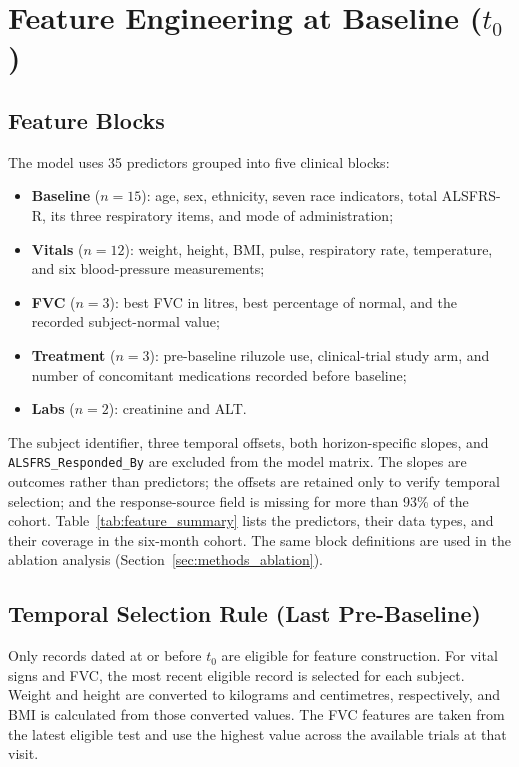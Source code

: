 \section{Feature Engineering at Baseline ($t_0$)}
\label{sec:methods_features}
\subsection{Feature Blocks}
\label{sec:methods_feature_blocks}
The model uses 35 predictors grouped into five clinical blocks:
\begin{itemize}
  \item \textbf{Baseline} ($n\!=\!15$): age, sex, ethnicity, seven race indicators, total \gls{ALSFRS-R}, its three respiratory items, and mode of administration;
  \item \textbf{Vitals} ($n\!=\!12$): weight, height, \gls{BMI}, pulse, respiratory rate, temperature, and six blood-pressure measurements;
  \item \textbf{FVC} ($n\!=\!3$): best \gls{FVC} in litres, best percentage of normal, and the recorded subject-normal value;
  \item \textbf{Treatment} ($n\!=\!3$): pre-baseline riluzole use, clinical-trial study arm, and number of concomitant medications recorded before baseline;
  \item \textbf{Labs} ($n\!=\!2$): creatinine and \gls{ALT}.
\end{itemize}
The subject identifier, three temporal offsets, both horizon-specific slopes, and \texttt{ALSFRS\_Responded\_By} are excluded from the model matrix. The slopes are outcomes rather than predictors; the offsets are retained only to verify temporal selection; and the response-source field is missing for more than 93\% of the cohort. Table~\ref{tab:feature_summary} lists the predictors, their data types, and their coverage in the six-month cohort. The same block definitions are used in the ablation analysis (Section~\ref{sec:methods_ablation}).



\subsection{Temporal Selection Rule (Last Pre-Baseline)}
\label{sec:methods_last_prebaseline}
Only records dated at or before $t_0$ are eligible for feature construction. For vital signs and \gls{FVC}, the most recent eligible record is selected for each subject. Weight and height are converted to kilograms and centimetres, respectively, and \gls{BMI} is calculated from those converted values. The FVC features are taken from the latest eligible test and use the highest value across the available trials at that visit.

